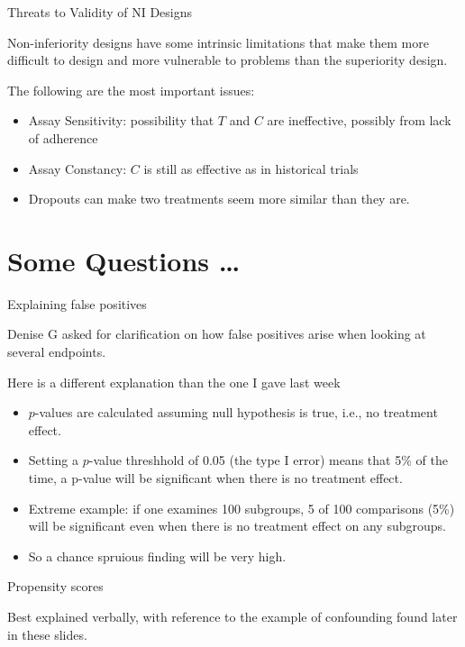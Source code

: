 \documentclass[ignorenonframetext,]{beamer}
\begin{document}
\begin{frame}{Threats to Validity of NI Designs}

Non-inferiority designs have some intrinsic limitations that make them
more difficult to design and more vulnerable to problems than the
superiority design. \medskip

The following are the most important issues:

\begin{itemize}
\item
  Assay Sensitivity: possibility that \(T\) and \(C\) are ineffective,
  possibly from lack of adherence
\item
  Assay Constancy: \(C\) is still as effective as in historical trials
\item
  Dropouts can make two treatments seem more similar than they are.
\end{itemize}

\end{frame}

\section{Some Questions \ldots}\label{some-questions}

\begin{frame}{Explaining false positives}

Denise G asked for clarification on how false positives arise when
looking at several endpoints.

Here is a different explanation than the one I gave last week

\begin{itemize}
\item
  \(p\)-values are calculated assuming null hypothesis is true, i.e., no
  treatment effect.
\item
  Setting a \(p\)-value threshhold of 0.05 (the type I error) means that
  5\% of the time, a p-value will be significant when there is no
  treatment effect.
\item
  Extreme example: if one examines 100 subgroups, 5 of 100 comparisons
  (5\%) will be significant even when there is no treatment effect on
  any subgroups.
\item
  So a chance spruious finding will be very high.
\end{itemize}

\end{frame}

\begin{frame}{Propensity scores}

Best explained verbally, with reference to the example of confounding
found later in these slides.

\end{frame}
\end{document}

